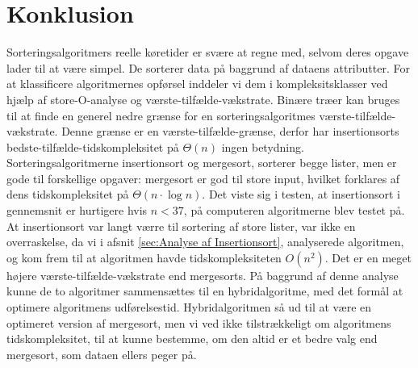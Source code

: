 \chapter{Konklusion}
\label{ch:Konklusion}

Sorteringsalgoritmers reelle køretider er svære at regne med, selvom deres opgave lader til at være simpel. De sorterer data på baggrund af dataens attributter. For at klassificere algoritmernes opførsel inddeler vi dem i kompleksitsklasser ved hjælp af store-O-analyse og værste-tilfælde-vækstrate. Binære træer kan bruges til at finde en generel nedre grænse for en sorteringsalgoritmes værste-tilfælde-vækstrate. Denne grænse er en værste-tilfælde-grænse, derfor har insertionsorts bedste-tilfælde-tidskompleksitet på $\Theta (n)$ ingen betydning. Sorteringsalgoritmerne insertionsort og mergesort, sorterer begge lister, men er gode til forskellige opgaver: mergesort er god til store input, hvilket forklares af dens tidskompleksitet på $\Theta (n \cdot \log n)$. Det viste sig i testen, at insertionsort i gennemsnit er hurtigere hvis $n < 37$, på computeren algoritmerne blev testet på. At insertionsort var langt værre til sortering af store lister, var ikke en overraskelse, da vi i afsnit \ref{sec:Analyse af Insertionsort}, analyserede algoritmen, og kom frem til at algoritmen havde tidskompleksiteten $O(n^2)$. Det er en meget højere værste-tilfælde-vækstrate end mergesorts. På baggrund af denne analyse kunne de to algoritmer sammensættes til en hybridalgoritme, med det formål at optimere algoritmens udførelsestid. Hybridalgoritmen så ud til at være en optimeret version af mergesort, men vi ved ikke tilstrækkeligt om algoritmens tidskompleksitet, til at kunne bestemme, om den altid er et bedre valg end mergesort, som dataen ellers peger på.
